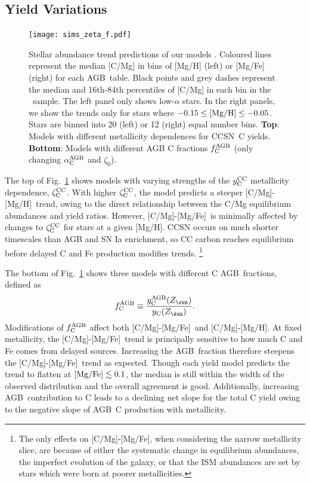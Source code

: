 \documentclass[fleqn,
usenatbib]{mnras}
\newcommand{\agb}{AGB}
\newcommand{\cc}{CCSN}
\newcommand{\caah}{[C/Mg]-[Mg/H]}
\newcommand{\caafe}{[C/Mg]-[Mg/Fe]}
\newcommand{\Yct}{{y_{\rm C}}}
\newcommand{\Ycc}{{y_{\rm C}^{\rm CC}}}
\newcommand{\Ycagb}{{y_{\rm C}^{\rm AGB}}}
\newcommand{\aagb}{\alpha_{\rm C}^{\rm AGB}}
\newcommand{\zcc}{\zeta_{\rm C}^{\rm CC}}
\newcommand{\fagb}{f_{\rm C}^{\rm AGB}}
\newcommand{\zetao}{\zeta_0}
\newcommand{\Zo}{ Z_{\sun}}
\begin{document}
\subsection{Yield Variations}\label{sec:results_highmass}
\label{sec:agb_results}

\begin{figure}
    \texttt{[image: sims\_zeta\_f.pdf]}
    
    \caption[]{
        Stellar abundance trend predictions of our models . Coloured lines represent the median [C/Mg] in bins of [Mg/H] (left) or [Mg/Fe] (right) for each \agb\ table. Black points and grey dashes represent the median and 16th-84th percentiles of [C/Mg] in each bin in the \citet{jack}~sample. 
        The left panel only shows low-$\alpha$ stars. In the right panels, we show the trends only for stars where $-0.15\leq {\rm [Mg/H]}\leq -0.05$.
        Stars are binned into 20 (left) or 12 (right) equal number bins. 
        \textbf{Top}: Models with different metallicity dependences for  \cc\ C yields. \textbf{Bottom}: Models with different AGB C fractions $\fagb$ (only changing $\aagb$ and $\zetao$).
    }
    \label{fig:zeta_f}
\end{figure}




The top of Fig.~\ref{fig:zeta_f} shows models with varying strengths of the $\Ycc$ metallicity dependence, $\zcc$. With higher $\zcc$, the model predicts a steeper \caah\ trend, owing to the direct relationship between the C/Mg equilibrium abundances and yield ratios. 
However, \caafe~is minimally affected by changes to $\zcc$ for stars at a given [Mg/H].
CCSN occurs on much shorter timescales than AGB and SN Ia enrichment, so CC carbon reaches equilibrium before delayed C and Fe production modifies trends. 
\footnote{The only effects on \caafe, when considering the narrow metallicity slice, are because of either the systematic change in equilibrium abundances, the imperfect evolution of the galaxy, or that the ISM abundances are set by stars which were born at poorer metallicities. }


The bottom of Fig.~\ref{fig:zeta_f} shows three models with different C \agb\  fractions, defined as 
\begin{equation}\label{eq:f_agb}
    \fagb \equiv \frac{\Ycagb(\Zo)}{\Yct(\Zo)}.
\end{equation}
Modifications of $\fagb$ affect both \caafe\ and \caah. At fixed metallicity, the \caafe\ trend is principally sensitive to how much C and Fe comes from delayed sources. Increasing the \agb\ fraction therefore steepens the \caafe\ trend as expected. Though each yield model predicts the trend to flatten at ${\rm [Mg/Fe]} \lesssim 0.1 $, the median is still within the width of the observed distribution and the overall agreement is good. Additionally, increasing \agb\ contribution to C leads to a declining net slope for the total C yield owing to the negative slope of \agb\ C production with metallicity.
\end{document}
